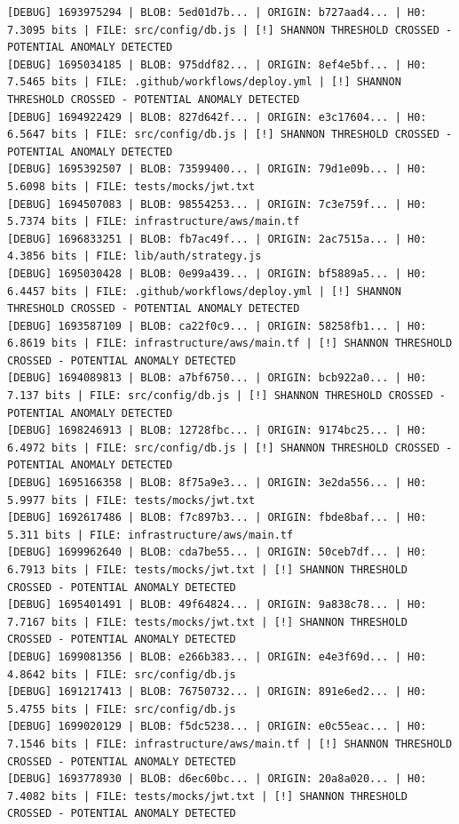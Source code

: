\documentclass[12pt, a4paper, oneside]{report}
\begin{document}
\begin{lstlisting}[basicstyle=\tiny\ttfamily]
[DEBUG] 1693975294 | BLOB: 5ed01d7b... | ORIGIN: b727aad4... | H0: 7.3095 bits | FILE: src/config/db.js | [!] SHANNON THRESHOLD CROSSED - POTENTIAL ANOMALY DETECTED
[DEBUG] 1695034185 | BLOB: 975ddf82... | ORIGIN: 8ef4e5bf... | H0: 7.5465 bits | FILE: .github/workflows/deploy.yml | [!] SHANNON THRESHOLD CROSSED - POTENTIAL ANOMALY DETECTED
[DEBUG] 1694922429 | BLOB: 827d642f... | ORIGIN: e3c17604... | H0: 6.5647 bits | FILE: src/config/db.js | [!] SHANNON THRESHOLD CROSSED - POTENTIAL ANOMALY DETECTED
[DEBUG] 1695392507 | BLOB: 73599400... | ORIGIN: 79d1e09b... | H0: 5.6098 bits | FILE: tests/mocks/jwt.txt
[DEBUG] 1694507083 | BLOB: 98554253... | ORIGIN: 7c3e759f... | H0: 5.7374 bits | FILE: infrastructure/aws/main.tf
[DEBUG] 1696833251 | BLOB: fb7ac49f... | ORIGIN: 2ac7515a... | H0: 4.3856 bits | FILE: lib/auth/strategy.js
[DEBUG] 1695030428 | BLOB: 0e99a439... | ORIGIN: bf5889a5... | H0: 6.4457 bits | FILE: .github/workflows/deploy.yml | [!] SHANNON THRESHOLD CROSSED - POTENTIAL ANOMALY DETECTED
[DEBUG] 1693587109 | BLOB: ca22f0c9... | ORIGIN: 58258fb1... | H0: 6.8619 bits | FILE: infrastructure/aws/main.tf | [!] SHANNON THRESHOLD CROSSED - POTENTIAL ANOMALY DETECTED
[DEBUG] 1694089813 | BLOB: a7bf6750... | ORIGIN: bcb922a0... | H0: 7.137 bits | FILE: src/config/db.js | [!] SHANNON THRESHOLD CROSSED - POTENTIAL ANOMALY DETECTED
[DEBUG] 1698246913 | BLOB: 12728fbc... | ORIGIN: 9174bc25... | H0: 6.4972 bits | FILE: src/config/db.js | [!] SHANNON THRESHOLD CROSSED - POTENTIAL ANOMALY DETECTED
[DEBUG] 1695166358 | BLOB: 8f75a9e3... | ORIGIN: 3e2da556... | H0: 5.9977 bits | FILE: tests/mocks/jwt.txt
[DEBUG] 1692617486 | BLOB: f7c897b3... | ORIGIN: fbde8baf... | H0: 5.311 bits | FILE: infrastructure/aws/main.tf
[DEBUG] 1699962640 | BLOB: cda7be55... | ORIGIN: 50ceb7df... | H0: 6.7913 bits | FILE: tests/mocks/jwt.txt | [!] SHANNON THRESHOLD CROSSED - POTENTIAL ANOMALY DETECTED
[DEBUG] 1695401491 | BLOB: 49f64824... | ORIGIN: 9a838c78... | H0: 7.7167 bits | FILE: tests/mocks/jwt.txt | [!] SHANNON THRESHOLD CROSSED - POTENTIAL ANOMALY DETECTED
[DEBUG] 1699081356 | BLOB: e266b383... | ORIGIN: e4e3f69d... | H0: 4.8642 bits | FILE: src/config/db.js
[DEBUG] 1691217413 | BLOB: 76750732... | ORIGIN: 891e6ed2... | H0: 5.4755 bits | FILE: src/config/db.js
[DEBUG] 1699020129 | BLOB: f5dc5238... | ORIGIN: e0c55eac... | H0: 7.1546 bits | FILE: infrastructure/aws/main.tf | [!] SHANNON THRESHOLD CROSSED - POTENTIAL ANOMALY DETECTED
[DEBUG] 1693778930 | BLOB: d6ec60bc... | ORIGIN: 20a8a020... | H0: 7.4082 bits | FILE: tests/mocks/jwt.txt | [!] SHANNON THRESHOLD CROSSED - POTENTIAL ANOMALY DETECTED

\end{lstlisting}
\end{document}

